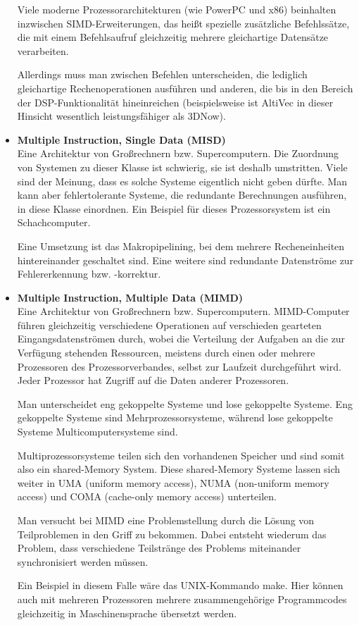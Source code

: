 \begin{itemize}
Viele moderne Prozessorarchitekturen (wie PowerPC und x86) beinhalten inzwischen SIMD-Erweiterungen, das heißt spezielle zusätzliche Befehlssätze, die mit einem Befehlsaufruf gleichzeitig mehrere gleichartige Datensätze verarbeiten.

Allerdings muss man zwischen Befehlen unterscheiden, die lediglich gleichartige Rechenoperationen ausführen und anderen, die bis in den Bereich der DSP-Funktionalität hineinreichen (beispielsweise ist AltiVec in dieser Hinsicht wesentlich leistungsfähiger als 3DNow). 

    \item \textbf{Multiple Instruction, Single Data (MISD)}\\ Eine Architektur von Großrechnern bzw. Supercomputern. Die Zuordnung von Systemen zu dieser Klasse ist schwierig, sie ist deshalb umstritten. Viele sind der Meinung, dass es solche Systeme eigentlich nicht geben dürfte. Man kann aber fehlertolerante Systeme, die redundante Berechnungen ausführen, in diese Klasse einordnen. Ein Beispiel für dieses Prozessorsystem ist ein Schachcomputer.

Eine Umsetzung ist das Makropipelining, bei dem mehrere Recheneinheiten hintereinander geschaltet sind. Eine weitere sind redundante Datenströme zur Fehlererkennung bzw. -korrektur. 

    \item \textbf{Multiple Instruction, Multiple Data (MIMD)}\\ Eine Architektur von Großrechnern bzw. Supercomputern. MIMD-Computer führen gleichzeitig verschiedene Operationen auf verschieden gearteten Eingangsdatenströmen durch, wobei die Verteilung der Aufgaben an die zur Verfügung stehenden Ressourcen, meistens durch einen oder mehrere Prozessoren des Prozessorverbandes, selbst zur Laufzeit durchgeführt wird. Jeder Prozessor hat Zugriff auf die Daten anderer Prozessoren.

Man unterscheidet eng gekoppelte Systeme und lose gekoppelte Systeme. Eng gekoppelte Systeme sind Mehrprozessorsysteme, während lose gekoppelte Systeme Multicomputersysteme sind.

Multiprozessorsysteme teilen sich den vorhandenen Speicher und sind somit also ein shared-Memory System. Diese shared-Memory Systeme lassen sich weiter in UMA (uniform memory access), NUMA (non-uniform memory access) und COMA (cache-only memory access) unterteilen.

Man versucht bei MIMD eine Problemstellung durch die Lösung von Teilproblemen in den Griff zu bekommen. Dabei entsteht wiederum das Problem, dass verschiedene Teilstränge des Problems miteinander synchronisiert werden müssen.

Ein Beispiel in diesem Falle wäre das UNIX-Kommando make. Hier können auch mit mehreren Prozessoren mehrere zusammengehörige Programmcodes gleichzeitig in Maschinensprache übersetzt werden. 
        \end{itemize}
        
